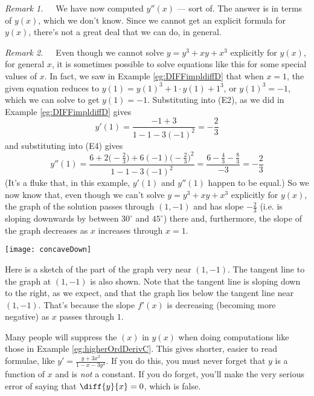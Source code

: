 \begin{eg}
\noindent\emph{Remark 1.}\ \ \ We have now computed $y''(x)$ --- sort of.
The answer is in terms of $y(x)$, which we don't know. Since we cannot
get an explicit formula for $y(x)$, there's not a great deal that we can do,
in general.

\noindent\emph{Remark 2.}\ \ \ Even though we cannot solve
$y=y^3+xy+x^3$ explicitly for $y(x)$, for general $x$, it is sometimes
possible to solve equations like this for some special values of $x$.
In fact, we saw in Example \ref{eg:DIFFimpldiffD} that when $x=1$,
the given equation reduces to $y(1)=y(1)^3+1\cdot y(1)+1^3$, or $y(1)^3=-1$,
which we can solve to get $y(1)=-1$. Substituting into (E2),
as we did in  Example \ref{eg:DIFFimpldiffD} gives
\begin{equation*}
y'(1) = \frac{-1+3}{1-1-3(-1)^2} = -\frac{2}{3}
\end{equation*}
and substituting into (E4) gives
\begin{equation*}
y''(1) = \frac{6+2\big(-\frac{2}{3}\big)+6(-1)\big(-\frac{2}{3}\big)^2}
                             {1-1-3(-1)^2}
   =\frac{6-\frac{4}{3}-\frac{8}{3}}{-3}
   = -\frac{2}{3}
\end{equation*}
(It's a fluke that, in this example, $y'(1)$ and $y''(1)$ happen to be equal.)
So we now know that, even though we can't solve $y=y^3+xy+x^3$ explicitly for
$y(x)$, the graph of the solution passes through $(1,-1)$ and has slope
$-\frac{2}{3}$ (i.e. is sloping downwards by between $30^\circ$ and $45^\circ$)
there and, furthermore, the slope of the graph decreases as $x$
increases through $x=1$.

\begin{efig}
 \begin{center}
 \texttt{[image: concaveDown]}
 \end{center}
\end{efig}
Here is a sketch of the part of the graph very near $(1, -1)$. The tangent line to the
graph at $(1, -1)$ is also shown. Note that the tangent line is sloping down to the right,
as we expect, and that the graph lies below the tangent line near $(1,-1)$. That's because
the slope $f'(x)$ is decreasing (becoming more negative) as $x$ passes through $1$.


\end{eg}

\begin{warning}\label{warning:dropx}
Many people will suppress the $(x)$ in $y(x)$ when doing
computations like those in Example \ref{eg:higherOrdDerivC}.
This gives shorter, easier to read formulae, like
$y'=\frac{y+3x^2}{1-x-3y^2}$. If you do this, you must never forget
that $y$ is a function of $x$ and is \emph{not} a constant. If you do forget,
you'll make the very serious error of saying that $\diff{y}{x}=0$,
which is false.

\end{warning}


